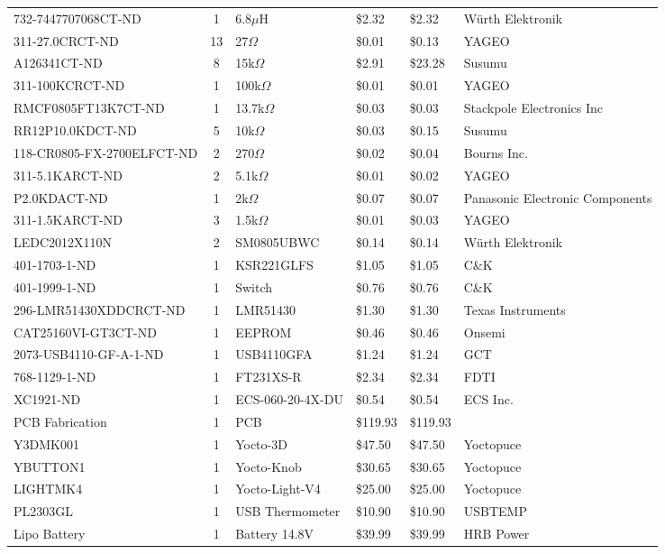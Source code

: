 \documentclass[../main.tex]{subfiles}
\begin{document}
\begin{longtable}{|p{5cm}|c|p{3cm}|p{1.3cm}|p{1.3cm}|p{5cm}|}
732-7447707068CT-ND & 1 & 6.8$\mu$H & \$2.32 & \$2.32 & Würth Elektronik \\
311-27.0CRCT-ND & 13 & 27$\Omega$ & \$0.01 & \$0.13 & YAGEO \\
A126341CT-ND & 8 & 15k$\Omega$ & \$2.91 & \$23.28 & Susumu \\
311-100KCRCT-ND & 1 & 100k$\Omega$ & \$0.01 & \$0.01 & YAGEO \\
RMCF0805FT13K7CT-ND & 1 & 13.7k$\Omega$ & \$0.03 & \$0.03 & Stackpole Electronics Inc \\
RR12P10.0KDCT-ND & 5 & 10k$\Omega$ & \$0.03 & \$0.15 & Susumu \\
118-CR0805-FX-2700ELFCT-ND & 2 & 270$\Omega$ & \$0.02 & \$0.04 & Bourns Inc. \\
311-5.1KARCT-ND & 2 & 5.1k$\Omega$ & \$0.01 & \$0.02 & YAGEO \\
P2.0KDACT-ND & 1 & 2k$\Omega$ & \$0.07 & \$0.07 & Panasonic Electronic Components \\
311-1.5KARCT-ND & 3 & 1.5k$\Omega$ & \$0.01 & \$0.03 & YAGEO \\
LEDC2012X110N & 2 & SM0805UBWC & \$0.14 & \$0.14 & Würth Elektronik \\
401-1703-1-ND & 1 & KSR221GLFS & \$1.05 & \$1.05 & C\&K \\
401-1999-1-ND & 1 & Switch & \$0.76 & \$0.76 & C\&K \\
296-LMR51430XDDCRCT-ND & 1 & LMR51430 & \$1.30 & \$1.30 & Texas Instruments \\
CAT25160VI-GT3CT-ND & 1 & EEPROM & \$0.46 & \$0.46 & Onsemi \\
2073-USB4110-GF-A-1-ND & 1 & USB4110GFA & \$1.24 & \$1.24 & GCT \\
768-1129-1-ND & 1 & FT231XS-R & \$2.34 & \$2.34 & FDTI \\
XC1921-ND & 1 & ECS-060-20-4X-DU & \$0.54 & \$0.54 & ECS Inc. \\
PCB Fabrication & 1 & PCB & \$119.93 & \$119.93 & \\
Y3DMK001 & 1 & Yocto-3D & \$47.50 & \$47.50 & Yoctopuce \\
YBUTTON1 & 1 & Yocto-Knob & \$30.65 & \$30.65 & Yoctopuce \\
LIGHTMK4 & 1 & Yocto-Light-V4 & \$25.00 & \$25.00 & Yoctopuce \\
PL2303GL & 1 & USB Thermometer & \$10.90 & \$10.90 & USBTEMP \\
Lipo Battery & 1 & Battery 14.8V & \$39.99 & \$39.99 & HRB Power \\
\hline
\end{longtable}
\end{document}

